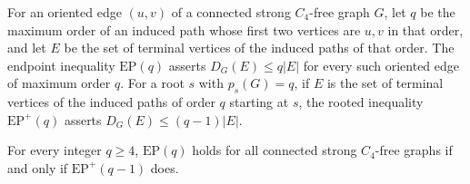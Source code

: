 \documentclass[ASNA]{USG}
\theoremstyle{WBstyletwo}
\numberwithin{equation}{section}
\newcommand{\pp}{p}
\begin{document}
For an oriented edge $(u,v)$ of a connected strong $C_4$-free graph $G$, let $q$ be the maximum order of an induced path whose first two vertices are $u,v$ in that order, and let $E$ be the set of terminal vertices of the induced paths of that order. The endpoint inequality $\mathrm{EP}(q)$ asserts $D_G(E)\le q|E|$ for every such oriented edge of maximum order $q$. For a root $s$ with $\pp_s(G)=q$, if $E$ is the set of terminal vertices of the induced paths of order $q$ starting at $s$, the rooted inequality $\mathrm{EP}^+(q)$ asserts $D_G(E)\le(q-1)|E|$.

\begin{proposition}\label{prop:ep}
For every integer $q\ge 4$, $\mathrm{EP}(q)$ holds for all connected strong $C_4$-free graphs if and only if $\mathrm{EP}^+(q-1)$ does.
\end{proposition}
\end{document}
